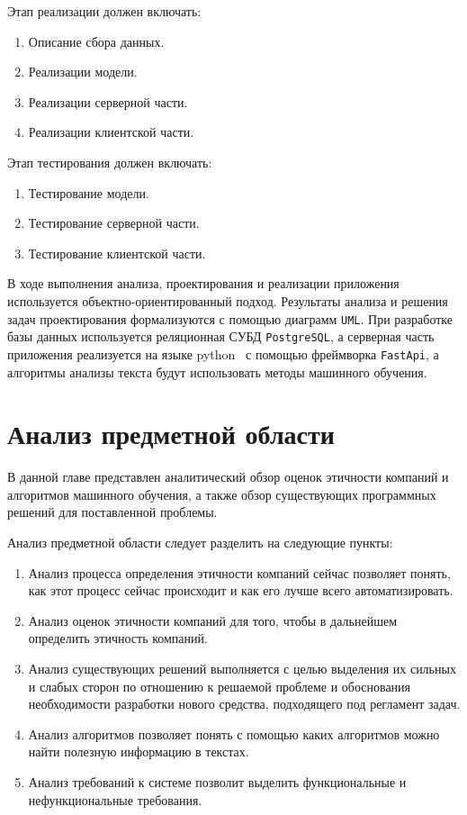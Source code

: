 \documentclass{article}
\begin{document}
Этап реализации должен включать:
\begin{enumerate}
\item Описание сбора данных.
\item Реализации модели.
\item Реализации серверной части.
\item Реализации клиентской части.
\end{enumerate}

Этап тестирования должен включать:
\begin{enumerate}
\item Тестирование модели.
\item Тестирование серверной части.
\item Тестирование клиентской части.
\end{enumerate}

В ходе выполнения анализа, проектирования и реализации приложения используется объектно-ориентированный подход. Результаты анализа и решения задач проектирования формализуются с помощью диаграмм \texttt{UML}. При разработке базы данных используется реляционная СУБД \texttt{PostgreSQL}, а серверная часть приложения реализуется на языке python~\autocite{vanrossum_python_2009} с помощью фреймворка \texttt{FastApi}, а алгоритмы анализы текста будут использовать методы машинного обучения.
\chapter{Анализ предметной области}
\label{sec:org8176655}
В данной главе представлен аналитический обзор оценок этичности компаний и алгоритмов машинного обучения, а также обзор существующих программных решений для поставленной проблемы.

Анализ предметной области следует разделить на следующие пункты:
\begin{enumerate}
\item Анализ процесса определения этичности компаний сейчас позволяет понять, как этот процесс сейчас происходит и как его лучше всего автоматизировать.
\item Анализ оценок этичности компаний для того, чтобы в дальнейшем определить этичность компаний.
\item Анализ существующих решений выполняется с целью выделения их сильных и слабых сторон по отношению к решаемой проблеме и обоснования необходимости разработки нового средства, подходящего под регламент задач.
\item Анализ алгоритмов позволяет понять с помощью каких алгоритмов можно найти полезную информацию в текстах.
\item Анализ требований к системе позволит выделить функциональные и нефункциональные требования.
\end{enumerate}
\end{document}
